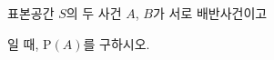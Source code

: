 표본공간 $S$의 두 사건 $A$, $B$가 서로 배반사건이고 \par\smallskip{}\par\smallskip\noindent 일 때, $\mathrm{P}(A)$를 구하시오.
